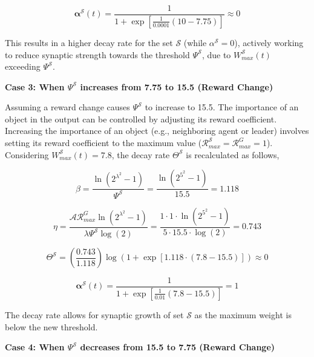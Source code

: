 \begin{equation*}
    \boldsymbol{\alpha}^{\mathcal{S}}(t) = \frac{1}{1 + \exp{\left[\frac{1}{0.0001}\left(10 - 7.75\right)\right]}} \approx 0
\end{equation*}

\noindent This results in a higher decay rate for the set \(\mathcal{S}\) (while \(\alpha^{\mathcal{S}}=0\)), actively working to reduce synaptic strength towards the threshold \(\Psi^{\mathcal{S}}\), due to \(W_{max}^{\mathcal{S}}(t)\) exceeding \(\Psi^{\mathcal{S}}\).

\textbf{Case 3: When \(\Psi^{\mathcal{S}}\) increases from 7.75 to 15.5 (Reward Change)}

Assuming a reward change causes \(\Psi^{\mathcal{S}}\) to increase to 15.5. The importance of an object in the output can be controlled by adjusting its reward coefficient. Increasing the importance of an object (e.g., neighboring agent or leader) involves setting its reward coefficient to the maximum value (\(\mathcal{R}_{max}^{\mathcal{S}}=\mathcal{R}_{max}^{G}=1\)). Considering \(W_{max}^{\mathcal{S}}(t) = 7.8\), the decay rate \(\Theta^{\mathcal{S}}\) is recalculated as follows,

\begin{equation*}
    \beta = \frac{\ln{(2^{\lambda^2}-1)}}{\Psi^{\mathcal{S}}} = \frac{\ln(2^{5^2} - 1)}{15.5} = 1.118
\end{equation*}

\begin{equation*}
    \eta = \frac{\mathcal{A}\mathcal{R}_{max}^{G} \ln{(2^{\lambda^2}-1)}}{\lambda\Psi^{\mathcal{S}} \log{(2)}} = \frac{1 \cdot 1 \cdot \ln(2^{5^2} - 1)}{5 \cdot 15.5 \cdot \log(2)} = 0.743
\end{equation*}

\begin{equation*}
    \Theta^{\mathcal{S}} = \left( \frac{0.743}{1.118} \right) \log \left(1 + \exp \left[1.118 \cdot (7.8 - 15.5)\right] \right) \approx 0
\end{equation*}

\begin{equation*}
    \boldsymbol{\alpha}^{\mathcal{S}}(t) = \frac{1}{1 + \exp{\left[\frac{1}{0.01}\left(7.8 - 15.5\right)\right]}} = 1
\end{equation*}

\noindent The decay rate allows for synaptic growth of set \(\mathcal{S}\) as the maximum weight is below the new threshold.

\textbf{Case 4: When \(\Psi^{\mathcal{S}}\) decreases from 15.5 to 7.75 (Reward Change)}

